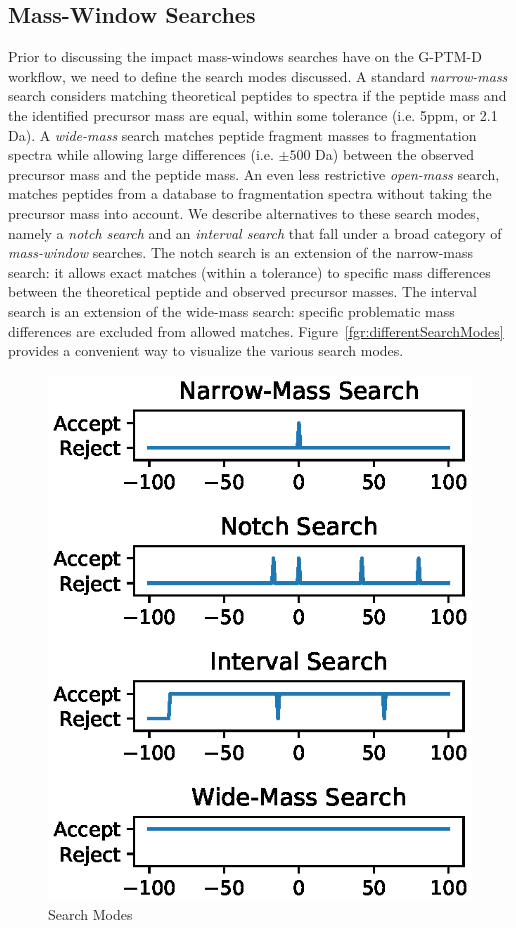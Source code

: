 \documentclass[journal=jprobs,manuscript=article]{achemso}
\begin{document}
\subsection{Mass-Window Searches}

Prior to discussing the impact mass-windows searches have on the G-PTM-D workflow, we need to define the search modes discussed. A standard \textit{narrow-mass} search considers matching theoretical peptides to spectra if the peptide mass and the identified precursor mass are equal, within some tolerance (i.e. 5ppm, or 2.1 Da).
A \textit{wide-mass} search matches peptide fragment masses to fragmentation spectra while allowing large differences (i.e. $\pm 500$ Da) between the observed precursor mass and the peptide mass.
An even less restrictive \textit{open-mass} search, matches peptides from a database to fragmentation spectra without taking the precursor mass into account.
We describe alternatives to these search modes, namely a \textit{notch search} and an \textit{interval search} that fall under a broad category of \textit{mass-window} searches.
The notch search is an extension of the narrow-mass search: it allows exact matches (within a tolerance) to specific mass differences between the theoretical peptide and observed precursor masses.
The interval search is an extension of the wide-mass search: specific problematic mass differences are excluded from allowed matches.
Figure~\ref{fgr:differentSearchModes} provides a convenient way to visualize the various search modes.

\begin{figure}
\includegraphics{fig1-searchTypes.eps}
\caption{Search Modes}
\label{fig:fig1-searchtypes}
\end{figure}
\end{document}
